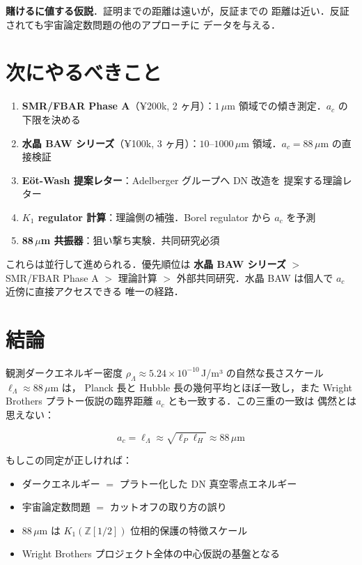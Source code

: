 \documentclass[11pt,a4paper]{article}
\begin{document}
\textbf{賭けるに値する仮説}．証明までの距離は遠いが，反証までの
距離は近い．反証されても宇宙論定数問題の他のアプローチに
データを与える．

\section{次にやるべきこと}

\begin{enumerate}
\item \textbf{SMR/FBAR Phase A}（¥200k, 2 ヶ月）：$1$\,$\mu$m
領域での傾き測定．$a_c$ の下限を決める
\item \textbf{水晶 BAW シリーズ}（¥100k, 3 ヶ月）：$10$--$1000\,\mu$m
領域．$a_c = 88\,\mu$m の直接検証
\item \textbf{Eöt-Wash 提案レター}：Adelberger グループへ DN 改造を
提案する理論レター
\item \textbf{$K_1$ regulator 計算}：理論側の補強．Borel regulator
から $a_c$ を予測
\item \textbf{88\,$\mu$m 共振器}：狙い撃ち実験．共同研究必須
\end{enumerate}

これらは並行して進められる．優先順位は
\textbf{水晶 BAW シリーズ} $>$ SMR/FBAR Phase A $>$ 理論計算 $>$
外部共同研究．水晶 BAW は個人で $a_c$ 近傍に直接アクセスできる
唯一の経路．

\section{結論}

観測ダークエネルギー密度 $\rho_\Lambda \approx 5.24\times 10^{-10}$\,J/m³
の自然な長さスケール $\ell_\Lambda \approx 88\,\mu$m は，
Planck 長と Hubble 長の幾何平均とほぼ一致し，また Wright Brothers
プラトー仮説の臨界距離 $a_c$ とも一致する．この三重の一致は
偶然とは思えない：

\begin{equation}
\boxed{a_c = \ell_\Lambda \approx \sqrt{\ell_P \ell_H} \approx 88\,\mu\text{m}}
\end{equation}

もしこの同定が正しければ：
\begin{itemize}
\item ダークエネルギー $=$ プラトー化した DN 真空零点エネルギー
\item 宇宙論定数問題 $=$ カットオフの取り方の誤り
\item 88\,$\mu$m は $K_1(\mathbb Z[1/2])$ 位相的保護の特徴スケール
\item Wright Brothers プロジェクト全体の中心仮説の基盤となる
\end{itemize}
\end{document}
